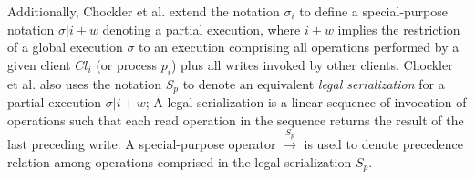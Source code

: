 \documentclass[journal,compsoc]{IEEEtran}
\begin{document}
    Additionally, Chockler et al. extend the notation $\sigma_i$ to define a special-purpose notation $\sigma |i + w$ denoting a partial
    execution, where $i + w$ implies the restriction of a global execution $\sigma$ to an execution comprising all operations performed by a given client $\mathit{Cl}_i$ (or process $p_i$) plus all writes invoked by
     other clients.  Chockler et al. also uses the notation $S_p$ to denote an equivalent \emph{legal serialization} for a partial execution $\sigma |i + w$;  A legal serialization is a linear sequence of invocation of operations such that each read operation in the sequence returns the result of the last preceding write. %
      A special-purpose operator $\xrightarrow{S_p}$ is used to denote precedence relation %
   among operations comprised in the legal serialization $S_p$.    
\end{document}
